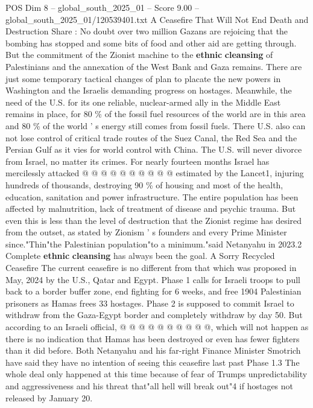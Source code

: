 \begin{textsample}{POS Dim 8 – global\_south\_2025\_01 – Score 9.00 – global\_south\_2025\_01/120539401.txt}  \label{ex:f8_pos_113}
A Ceasefire That Will Not End Death and Destruction Share : No doubt over two million Gazans are rejoicing that the bombing has stopped and some bits of food and other aid are getting through.
But the commitment of the Zionist machine to the \textbf{ethnic} \textbf{cleansing} of Palestinians and the annexation of the West Bank and Gaza remains.
There are just some temporary tactical changes of plan to placate the new powers in Washington and the Israelis demanding progress on hostages.
Meanwhile, the need of the U.S. for its one reliable, nuclear-armed ally in the Middle East remains in place, for 80 \% of the fossil fuel resources of the world are in this area and 80 \% of the world ' s energy still comes from fossil fuels.
There U.S. also can not lose control of critical trade routes of the Suez Canal, the Red Sea and the Persian Gulf as it vies for world control with China.
The U.S. will never divorce from Israel, no matter its crimes.
For nearly fourteen months Israel has mercilessly attacked @ @ @ @ @ @ @ @ @ @ estimated by the Lancet1, injuring hundreds of thousands, destroying 90 \% of housing and most of the health, education, sanitation and power infrastructure.
The entire population has been affected by malnutrition, lack of treatment of disease and psychic trauma.
But even this is less than the level of destruction that the Zionist regime has desired from the outset, as stated by Zionism ' s founders and every Prime Minister since."Thin"the Palestinian population"to a minimum."said Netanyahu in 2023.2 Complete \textbf{ethnic} \textbf{cleansing} has always been the goal.
A Sorry Recycled Ceasefire The current ceasefire is no different from that which was proposed in May, 2024 by the U.S., Qatar and Egypt.
Phase 1 calls for Israeli troops to pull back to a border buffer zone, end fighting for 6 weeks, and free 1904 Palestinian prisoners as Hamas frees 33 hostages.
Phase 2 is supposed to commit Israel to withdraw from the Gaza-Egypt border and completely withdraw by day 50.
But according to an Israeli official, @ @ @ @ @ @ @ @ @ @, which will not happen as there is no indication that Hamas has been destroyed or even has fewer fighters than it did before.
Both Netanyahu and his far-right Finance Minister Smotrich have said they have no intention of seeing this ceasefire last past Phase 1.3 The whole deal only happened at this time because of fear of Trumps unpredictability and aggressiveness and his threat that"all hell will break out"4 if hostages not released by January 20.

\end{textsample}
